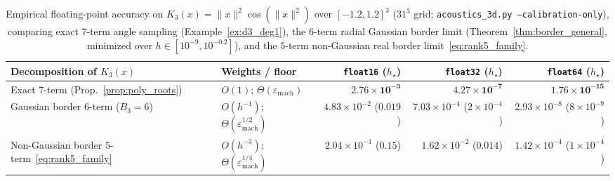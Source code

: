 \documentclass[11pt,a4paper]{article}
\theoremstyle{plain}
\theoremstyle{definition}
\begin{document}
\begin{table}[!htbp]
\centering
\caption{Empirical floating-point accuracy on $K_3(x) = \|x\|^2\cos(\|x\|^2)$ over $[-1.2, 1.2]^3$ ($31^3$ grid; \texttt{acoustics\_3d.py --calibration-only}), comparing exact $7$-term angle sampling (Example~\ref{ex:d3_deg1}), the $6$-term radial Gaussian border limit (Theorem~\ref{thm:border_general}, minimized over $h \in [10^{-9}, 10^{-0.2}]$), and the $5$-term non-Gaussian real border limit~\eqref{eq:rank5_family}.}\label{tab:border_prec}
\smallskip
{\scriptsize\setlength{\tabcolsep}{2.1pt}
\begin{tabular}{@{}>{\raggedright\arraybackslash}p{4.1cm}lrrr@{}}
\toprule
Decomposition of $K_3(x)$ & Weights / floor & \texttt{float16} ($h_\star$) & \texttt{float32} ($h_\star$) & \texttt{float64} ($h_\star$) \\
\midrule
Exact $7$-term (Prop.~\ref{prop:poly_roots}) & $O(1)$;\; $\Theta(\varepsilon_{\mathrm{mach}})$ & $\mathbf{2.76{\times}10^{-3}}$ & $\mathbf{4.27{\times}10^{-7}}$ & $\mathbf{1.76{\times}10^{-15}}$ \\
Gaussian border $6$-term ($B_3{=}6$) & $O(h^{-1})$;\; $\Theta(\varepsilon_{\mathrm{mach}}^{1/2})$ & $4.83{\times}10^{-2}$ ($0.019$) & $7.03{\times}10^{-4}$ ($2{\times}10^{-4}$) & $2.93{\times}10^{-8}$ ($8{\times}10^{-9}$) \\
Non-Gaussian border $5$-term~\eqref{eq:rank5_family} & $O(h^{-3})$;\; $\Theta(\varepsilon_{\mathrm{mach}}^{1/4})$ & $2.04{\times}10^{-1}$ ($0.15$) & $1.62{\times}10^{-2}$ ($0.014$) & $1.42{\times}10^{-4}$ ($1{\times}10^{-4}$) \\
\bottomrule
\end{tabular}}
\end{table}
\end{document}
